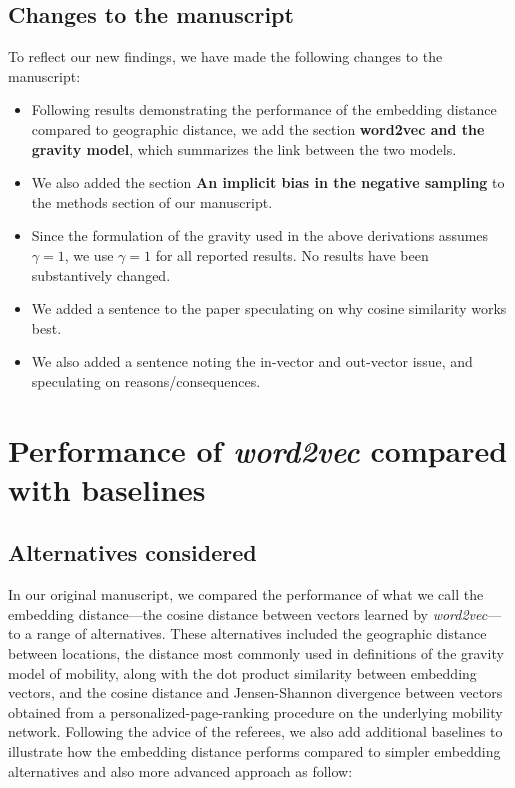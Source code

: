 \documentclass[12pt,a4paper]{article}
\begin{document}
\subsection{Changes to the manuscript}
To reflect our new findings, we have made the following changes to the manuscript:
\begin{itemize}
	\itemsep0em
	\item Following results demonstrating the performance of the embedding distance compared to geographic distance, we add the section \textbf{word2vec and the gravity model}, which summarizes the link between the two models.
	\item We also added the section \textbf{An implicit bias in the negative sampling} to the methods section of our manuscript.
	\item Since the formulation of the gravity used in the above derivations assumes $\gamma = 1$, we use $\gamma = 1$ for all reported results. No results have been substantively changed.
	\item We added a sentence to the paper speculating on why cosine similarity works best.
	\item We also added a sentence noting the in-vector and out-vector issue, and speculating on reasons/consequences.
\end{itemize}


%
%
\section{Performance of \textit{word2vec} compared with baselines}
\subsection{Alternatives considered}
In our original manuscript, we compared the performance of what we call the embedding distance---the cosine distance between vectors learned by \textit{word2vec}---to a range of alternatives.
These alternatives included the geographic distance between locations, the distance most commonly used in definitions of the gravity model of mobility, along with the dot product similarity between embedding vectors, and the cosine distance and Jensen-Shannon divergence between vectors obtained from a personalized-page-ranking procedure on the underlying mobility network. Following the advice of the referees, we also add additional baselines to illustrate how the embedding distance performs compared to simpler embedding alternatives and also more advanced approach as follow:
\end{document}
